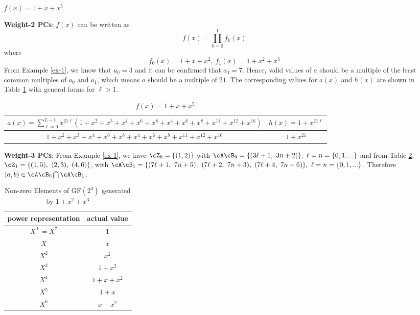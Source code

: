 \begin{example}
$f(x)=1+x+x^5$\newline

\textbf{Weight-2 PCs}: $f(x)$ can be written as 
$$f(x)=\prod_{k=0}^{1}f_k(x)$$
where 
$$f_0(x)=1+x+x^2,~f_1(x)=1+x^2+x^3$$ 
From Example \ref{ex-1}, we know that $a_0=3$ and it can be confirmed that $a_1=7$.
Hence, valid values of $a$ should be a multiple of the least common multiples of $a_0$ and $a_1$, which means $a$ should be a multiple of $21$.
The corresponding values for $a(x)$ and $h(x)$ are shown in Table \ref{novelTab1-c} with general forms for $\ell>1$.

\begin{table}[htbp]
\renewcommand{\arraystretch}{1.3}
 \caption{$f(x)=1+x+x^5$}
 \centering
\begin{tabular}{c c } 
\hline
 $a(x)=\sum_{\ell=0}^{L-1} x^{21\ell}(1+x^2+x^3+x^4+x^6+x^8+x^{4}+x^{6}+x^{8}+x^{11}+x^{12}+x^{16})$ & $h(x)=1+x^{21\ell}$ \\ [0.5ex] 
\hline\hline
$1+x^2+x^3+x^4+x^6+x^8+x^{4}+x^{6}+x^{8}+x^{11}+x^{12}+x^{16}$ & $1+x^{21}$\\ 
\end{tabular}
 \label{novelTab1-c}
\end{table}

\textbf{Weight-3 PCs}:
From Example \ref{ex-1}, we have $\cZ_0=\{ (1,2)\}$ with $\cA \cB_0=\{( 3\ell+1,~3n+2)\},~\ell=n=\{0,1,...\}$ and from Table \ref{novelTabWt3-5}, $ \cZ_1=\{(1,5),~(2,3),~(4,6)\}$, with $\cA \cB_1=\{(7\ell+1,~7n+5),~(7\ell+2,~7n+3),~(7\ell+4,~7n+6) \},~\ell=n=\{0,1,...\}$. Therefore $(a,b) \in \cA \cB_0 \bigcap \cA \cB_1$.

\begin{table}[htbp]
 \caption{Non-zero Elements of GF$(2^3)$ generated by $1+x^2+x^3$}
\centering
 \begin{tabular}{c c} 
 \hline
 power representation & actual value \\ [0.5ex] 
 \hline\hline
$X^0~=X^7$ & $1$\\
\hline
$X$ & $x$\\
\hline
$X^2$ &  $x^2$\\
\hline
$X^3$ &  $1+x^2$\\
\hline
$X^4$ &  $1+x+x^2$\\
\hline
$X^5$ &  $1+x$\\
\hline
$X^6$ &  $x+x^2$\\
\hline
 \end{tabular}
 \label{novelTabWt3-5}
\end{table}


\end{example}
